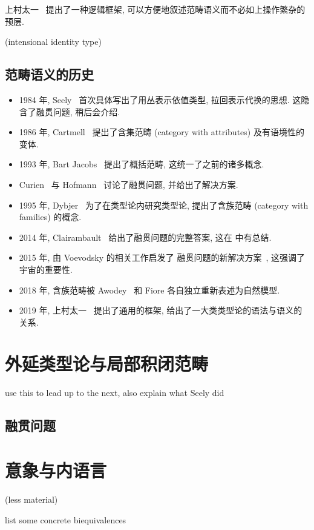 上村太一~\cite{uemura:2019:general} 提出了一种逻辑框架,
可以方便地叙述范畴语义而不必如上操作繁杂的预层.

(intensional identity type)

\subsection{范畴语义的历史}

\begin{itemize}
\item 1984 年, Seely~\cite{seely:1984:lccc}
首次具体写出了用丛表示依值类型, 拉回表示代换的思想.
这隐含了融贯问题, 稍后会介绍.
\item 1986 年, Cartmell~\cite{cartmell:1986:contextualcat}
提出了含集范畴 (category with attributes) 及有语境性的变体.
\item 1993 年, Bart Jacobs~\cite{jacobs:1993:comprehensioncat}
提出了概括范畴, 这统一了之前的诸多概念.
\item Curien~\cite{curien:1993:coherence} 与 Hofmann~\cite{hofmann:1995:lccccoh}
讨论了融贯问题, 并给出了解决方案.
\item 1995 年, Dybjer~\cite{dybjer:1995:internal}
为了在类型论内研究类型论, 提出了含族范畴 (category with families) 的概念.
\item 2014 年, Clairambault~\cite{clairambault:2014:biequivalence}
给出了融贯问题的完整答案, 这在 \cite{curien:2014:revisit} 中有总结.
\item 2015 年, 由 Voevodsky 的相关工作启发了
融贯问题的新解决方案~\cite{lumsdaine:2015:universes}, 这强调了宇宙的重要性.
\item 2018 年, 含族范畴被 Awodey~\cite{awodey:2018:natural} 和 Fiore 各自独立重新表述为自然模型.
\item 2019 年, 上村太一~\cite{uemura:2019:general}
提出了通用的框架, 给出了一大类类型论的语法与语义的关系.
\end{itemize}

\section{外延类型论与局部积闭范畴}

use this to lead up to the next, also explain what Seely did

\subsection{融贯问题}

\section{意象与内语言}\label{category:inner}

(less material)

list some concrete biequivalences

